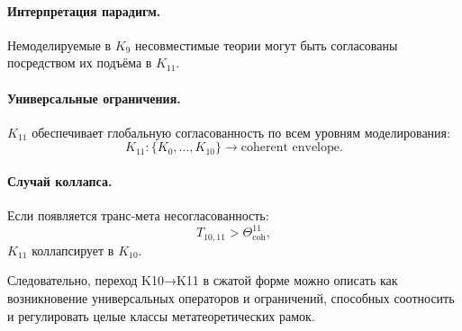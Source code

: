 \paragraph{Интерпретация парадигм.}
Немоделируемые в $K_9$ несовместимые теории могут быть согласованы посредством
их подъёма в $K_{11}$.

\paragraph{Универсальные ограничения.}
$K_{11}$ обеспечивает глобальную согласованность по всем уровням моделирования:
\[
K_{11} : \{K_0,\dots,K_{10}\} \rightarrow \text{coherent envelope}.
\]

\paragraph{Случай коллапса.}
Если появляется транс-мета несогласованность:
\[
T_{10,11} > \Theta^{11}_{\mathrm{coh}},
\]
$K_{11}$ коллапсирует в $K_{10}$.

Следовательно, переход K10→K11 в сжатой форме можно описать как
возникновение универсальных операторов и ограничений, способных соотносить и
регулировать целые классы метатеоретических рамок.
